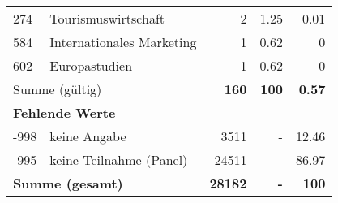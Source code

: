 \begin{longtable}{lXrrr}
        274 & \multicolumn{1}{X}{Tourismuswirtschaft} & %
          \num{2} &
          \num[round-mode=places,round-precision=2]{1,25} &
          \num[round-mode=places,round-precision=2]{0,01} \\

        584 & \multicolumn{1}{X}{Internationales Marketing} & %
          \num{1} &
          \num[round-mode=places,round-precision=2]{0,62} &
          \num[round-mode=places,round-precision=2]{0} \\

        602 & \multicolumn{1}{X}{Europastudien} & %
          \num{1} &
          \num[round-mode=places,round-precision=2]{0,62} &
          \num[round-mode=places,round-precision=2]{0} \\

     \midrule
     \multicolumn{2}{l}{Summe (gültig)} &
       \textbf{\num{160}} &
     \textbf{100} &
       \textbf{\num[round-mode=places,round-precision=2]{0,57}} \\
     \multicolumn{5}{l}{\textbf{Fehlende Werte}}\\
       -998 &
       keine Angabe &
         \num{3511} &
        - &
         \num[round-mode=places,round-precision=2]{12,46} \\
       -995 &
       keine Teilnahme (Panel) &
         \num{24511} &
        - &
         \num[round-mode=places,round-precision=2]{86,97} \\
     \midrule
     \multicolumn{2}{l}{\textbf{Summe (gesamt)}} &
          \textbf{\num{28182}} &
        \textbf{-} &
        \textbf{100} \\
     \bottomrule
     \end{longtable}
     
